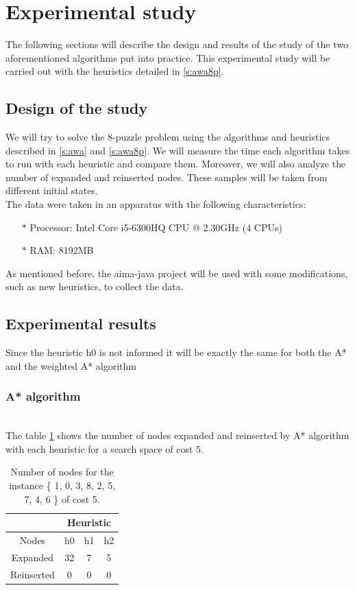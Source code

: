 \documentclass[runningheads]{llncs}
\begin{document}
\section{Experimental study}
The following sections will describe the design and results of the study of the two aforementioned algorithms put into practice. This experimental study will be carried out with the heuristics detailed in \ref{s:awa8p}.
\subsection{Design of the study}
We will try to solve the 8-puzzle problem using the algorithms and heuristics described in \ref{s:awa} and \ref{s:awa8p}. We will measure the time each algorithm takes to run with each heuristic and compare them. Moreover, we will also analyze the number of expanded and reinserted nodes. These samples will be taken from different initial states.
\\
The data were taken in an apparatus with the following characteristics:

\begin{itemize}
\item[$\ast$] Processor: Intel Core i5-6300HQ CPU @ 2.30GHz (4 CPUs)
\item[$\ast$] RAM: 8192MB
\end{itemize}
As mentioned before, the aima-java project will be used with some modifications, such as new heuristics, to collect the data.
\subsection{Experimental results}
Since the heuristic h0 is not informed it will be exactly the same for both the A* and the weighted A* algorithm
\subsubsection{A* algorithm}~\\

The table \ref{tab:table1} shows the number of nodes expanded and reinserted by A* algorithm with each heuristic for a search space of cost 5.
\begin{table}
    \centering
\caption{\label{tab:table1}Number of nodes for the instance \{ 1, 0, 3, 8, 2, 5, 7, 4, 6 \} of cost 5.}
    \begin{tabular}{|c|c|c|c|}
    \hline
       & \multicolumn{3}{|c|}{Heuristic} \\ \hline
        Nodes & h0 & h1 & h2 \\ \hline
        Expanded & 32 & 7 & 5 \\ \hline
        Reinserted & 0 & 0 & 0 \\ \hline
    \end{tabular}
\end{table}
\end{document}
